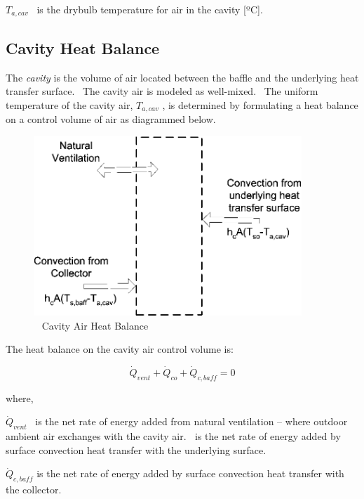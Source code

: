 {\({T_{a,cav}}\) ~is the drybulb temperature for air in the cavity {[}ºC{]}.

\subsection{Cavity Heat Balance}\label{cavity-heat-balance}

The \emph{cavity} is the volume of air located between the baffle and the underlying heat transfer surface.~ The cavity air is modeled as well-mixed.~ The uniform temperature of the cavity air, \({T_{a,cav}}\) , is determined by formulating a heat balance on a control volume of air as diagrammed below.

\begin{figure}[hbtp] %
\centering
\includegraphics[width=0.9\textwidth, height=0.9\textheight, keepaspectratio=true]{media/image469.png}
\caption{  Cavity Air Heat Balance \protect \label{fig:cavity-air-heat-balance}}
\end{figure}

The heat balance on the cavity air control volume is:

\begin{equation}
{\dot Q_{vent}} + {\dot Q_{co}} + {\dot Q_{c,baff}} = 0
\end{equation}

where,

\({\dot Q_{vent}}\) ~is the net rate of energy added from natural ventilation -- where outdoor ambient air exchanges with the cavity air. \(_{ }\)~is the net rate of energy added by surface convection heat transfer with the underlying surface.

\({\dot Q_{c,baff}}\) is the net rate of energy added by surface convection heat transfer with the collector.

}
